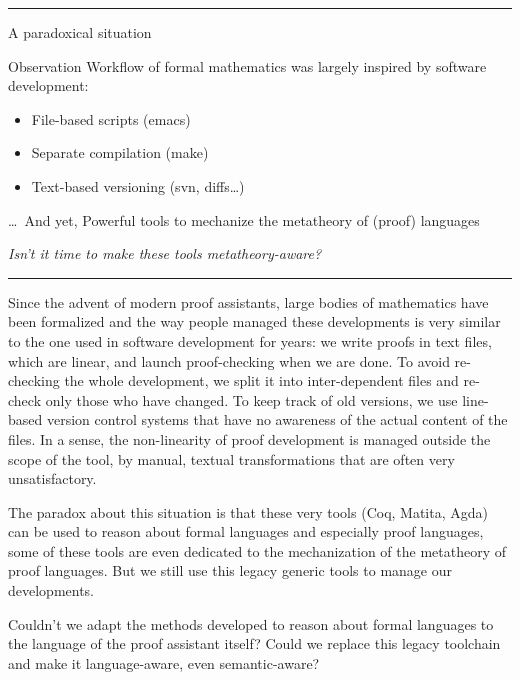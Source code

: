 \documentclass[ignorenonframetext,red]{beamer}
\begin{document}
\hrule
\begin{frame}{A paradoxical situation}  
  \begin{block}{Observation}
    Workflow of formal mathematics was largely inspired by software
    development:
    \begin{itemize}
    \item File-based scripts (\textsf{emacs})
    \item Separate compilation (\textsf{make})
    \item Text-based versioning (\textsf{svn}, \textsf{diff}s\ldots)
    \end{itemize}
  \end{block}
  \pause
  \begin{block}{\ldots\ And yet,}
    Powerful tools to mechanize the metatheory of (proof) languages
  \end{block}
  \vspace{0.6em}
  \pause
  \begin{center}
    {\large \it Isn't it time to make these tools metatheory-aware?}
  \end{center}
\end{frame}
\hrule

Since the advent of modern proof assistants, large bodies of
mathematics have been formalized and the way people managed these
developments is very similar to the one used in software development
for years: we write proofs in text files, which are linear, and launch
proof-checking when we are done. To avoid re-checking the whole
development, we split it into inter-dependent files and re-check only
those who have changed. To keep track of old versions, we use
line-based version control systems that have no awareness of the
actual content of the files. In a sense, the non-linearity of proof
development is managed outside the scope of the tool, by manual,
textual transformations that are often very unsatisfactory.

The paradox about this situation is that these very tools (Coq,
Matita, Agda) can be used to reason about formal languages and
especially proof languages, some of these tools are even dedicated to
the mechanization of the metatheory of proof languages. But we still
use this legacy generic tools to manage our developments.

Couldn't we adapt the methods developed to reason about formal
languages to the language of the proof assistant itself? Could we
replace this legacy toolchain and make it language-aware, even
semantic-aware?
\end{document}

